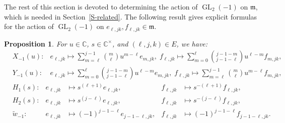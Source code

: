\documentclass[11pt,letterpaper]{amsart}
\newcounter{thecounter}
\numberwithin{thecounter}{section}
\newtheorem{proposition}[thecounter]{Proposition}
\theoremstyle{definition}
\DeclareMathOperator{\GL}{GL}
\DeclareMathOperator{\Aut}{Aut}
\newcommand{\C}{{\mathbb C}}
\begin{document}
The rest of this section is devoted to determining the action of $\GL_2(-1)$ on $\mathfrak{m}$,
which is needed in Section~\ref{S-related}.
The following result gives explicit formulas for the action of $\GL_2(-1)$ on $e_{\ell,jk},f_{\ell,jk}\in\mathfrak{m}$.


\begingroup\allowdisplaybreaks
\begin{proposition}\label{P-GL-1action}
 For $u\in\C$, $s\in\C^\times$, and $(\ell,j,k)\in E$, we have:
\begin{align*}
&X_{-1}(u):& 
 e_{\ell,jk} \mapsto \sum_{m=\ell}^{j-1} \binom{m}{\ell} u^{m-\ell}e_{m,jk},\; f_{\ell,jk}   \mapsto \sum_{m=0}^\ell   \binom{j-1-m}{j-1-\ell} u^{\ell-m}f_{m,jk},\\
&Y_{-1}(u):&  
  e_{\ell,jk}   \mapsto \sum_{m=0}^\ell   \binom{j-1-m}{j-1-\ell} u^{\ell-m}e_{m,jk}, \; f_{\ell,jk} \mapsto \sum_{m=\ell}^{j-1} \binom{m}{\ell} u^{m-\ell}f_{m,jk},
\end{align*}
\begin{align*}
&H_1(s):&   e_{\ell,jk}&\mapsto s^{(\ell+1)} e_{\ell,jk}, &  f_{\ell,jk}& \mapsto s^{-(\ell+1)} f_{\ell,jk},\\
&H_2(s):&     e_{\ell,jk}& \mapsto s^{(j-\ell)} e_{\ell,jk},  &  f_{\ell,jk}& \mapsto s^{-(j-\ell)} f_{\ell,jk},\\
&\widetilde{w}_{-1}:&   e_{\ell,jk} & \mapsto  (-1)^{j-1-\ell} e_{j-1-\ell,jk}, &  f_{\ell,jk} & \mapsto  (-1)^{j-1-\ell} f_{j-1-\ell,jk}.
\end{align*}
\end{proposition}
\end{document}
